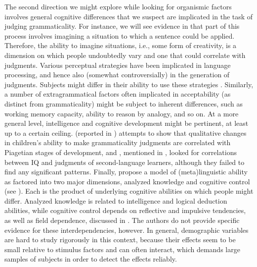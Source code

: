 The second direction we might explore while looking for organismic factors involves general cognitive differences that we suspect are implicated in the task of judging grammaticality. For instance, we will see evidence in  that part of this process involves imagining a situation to which a sentence could be applied. Therefore, the ability to imagine situations, i.e., some form of creativity, is a dimension on which people undoubtedly vary and one that could correlate with judgments. Various perceptual strategies have been implicated in language processing, and hence also (somewhat controversially) in the generation of judgments. Subjects might differ in their ability to use these strategies \citep{Botha1973}. Similarly, a number of extragrammatical factors often implicated in acceptability (as distinct from grammaticality) might be subject to inherent differences, such as working memory capacity, ability to reason by analogy, and so on. At a more general level, intelligence and cognitive development might be pertinent, at least up to a certain ceiling. \citet{Hakes1980} (reported in ) attempts to show that qualitative changes in children's ability to make grammaticality judgments are correlated with Piagetian stages of development, and \citet{MasnyEtAl1985}, mentioned in , looked for correlations between IQ and judgments
of second-language learners, although they failed to find any significant patterns. Finally, \citet{BialystokEtAl1985} propose a model of (meta)linguistic ability as factored into two major dimensions, analyzed knowledge and cognitive control (see ). Each is the product of underlying cognitive abilities on which people might differ. Analyzed knowledge is related to intelligence and logical deduction abilities, while cognitive control depends on reflective and impulsive tendencies, as well as field dependence, discussed in . The authors do not provide specific evidence for these interdependencies, however. In general, demographic variables are hard to study rigorously in this context, because their effects seem to be small relative to stimulus factors and can often interact, which demands large samples of subjects in order to detect the effects reliably.

